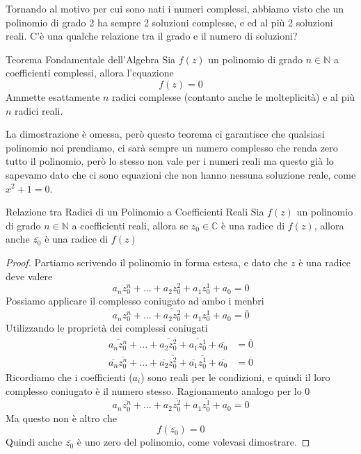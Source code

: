 \documentclass{rapport}
\begin{document}
Tornando al motivo per cui sono nati i numeri complessi, abbiamo visto che un polinomio di grado 2 ha sempre 2 soluzioni complesse, e ed al più 2 soluzioni reali. C'è una qualche relazione tra il grado e il numero di soluzioni?

\begin{teorema}{Teorema Fondamentale dell'Algebra}{}
  Sia $f(z)$ un polinomio di grado $n\in \mathbb{N}$ a coefficienti complessi, allora l'equazione 
  \[
  f(z) = 0
  \]
  Ammette esattamente $n$ radici complesse (contanto anche le molteplicità) e al più $n$ radici reali.
\end{teorema}

La dimostrazione è omessa, però questo teorema ci garantisce che qualsiasi polinomio noi prendiamo, ci sarà sempre un numero complesso che renda zero tutto il polinomio, però lo stesso non vale per i numeri reali ma questo già lo sapevamo dato che ci sono equazioni che non hanno nessuna soluzione reale, come $x^2+1=0$.

\begin{teorema}{Relazione tra Radici di un Polinomio a Coefficienti Reali}{}
  Sia $f(z)$ un polinomio di grado $n\in \mathbb{N}$ a coefficienti reali, allora se $z_0\in\mathbb{C}$ è una radice di $f(z)$, allora anche $\overline{z_0}$ è una radice di $f(z)$ 
  \end{teorema}
\begin{proof}
  Partiamo scrivendo il polinomio in forma estesa, e dato che $z$ è una radice deve valere
  \[
  a_nz_0^n + ... + a_2z_0^2 + a_1z_0^1 + a_0 = 0
  \]
  Possiamo applicare il complesso coniugato ad ambo i menbri
  \[
  \overline{a_nz_0^n + ... + a_2z_0^2 + a_1z_0^1 + a_0} = \overline{0}
  \]
  Utilizzando le proprietà dei complessi coniugati
  \begin{align*}
    \overline{a_nz_0^n} + ... + \overline{a_2z_0^2} + \overline{a_1z_0^1} + \overline{a_0} &= \overline{0}   \\  
    \overline{a_n}\overline{z_0^n} + ... + \overline{a_2}\overline{z_0^2} + \overline{a_1}\overline{z_0^1} + \overline{a_0} &= \overline{0} 
  \end{align*}
   Ricordiamo che i coefficienti ($a_i$) sono reali per le condizioni, e quindi il loro complesso coniugato è il numero stesso. Ragionamento analogo per lo 0
   \[
a_n\overline{z_0^n} + ... + a_2\overline{z_0^2} + a_1\overline{z_0^1} +a_0= 0
   \]
   Ma questo non è altro che 
   \[
   f(\overline{z_0}) = 0
   \]
   Quindi anche $\overline{z_0}$ è uno zero del polinomio, come volevasi dimostrare.
\end{proof}
\end{document}
